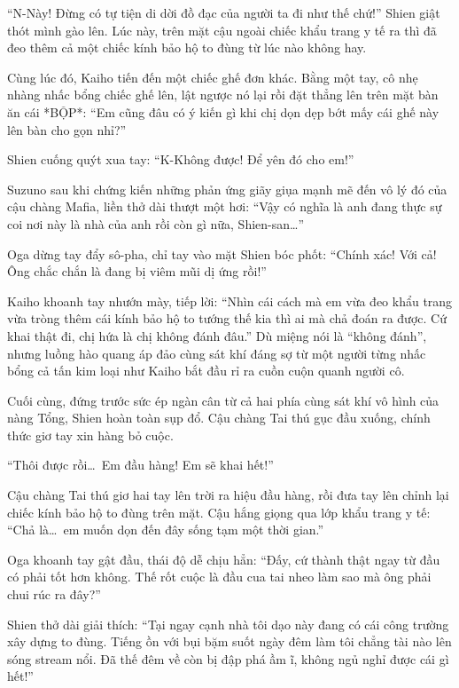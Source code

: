 \documentclass[../main.tex]{subfiles}
\begin{document}
``N-Này! Đừng có tự tiện di dời đồ đạc của người ta đi như thế chứ!'' Shien giật thót mình gào lên. Lúc này, trên mặt cậu ngoài chiếc khẩu trang y tế ra thì đã đeo thêm cả một chiếc kính bảo hộ to đùng từ lúc nào không hay.


Cùng lúc đó, Kaiho tiến đến một chiếc ghế đơn khác. Bằng một tay, cô nhẹ nhàng nhấc bổng chiếc ghế lên, lật ngược nó lại rồi đặt thẳng lên trên mặt bàn ăn cái *BỘP*: ``Em cũng đâu có ý kiến gì khi chị dọn dẹp bớt mấy cái ghế này lên bàn cho gọn nhỉ?''

Shien cuống quýt xua tay: ``K-Không được! Để yên đó cho em!''

Suzuno sau khi chứng kiến những phản ứng giãy giụa mạnh mẽ đến vô lý đó của cậu chàng Mafia, liền thở dài thượt một hơi: ``Vậy có nghĩa là anh đang thực sự coi nơi này là nhà của anh rồi còn gì nữa, Shien-san\dots''

Oga dừng tay đẩy sô-pha, chỉ tay vào mặt Shien bóc phốt: ``Chính xác! Với cả! Ông chắc chắn là đang bị viêm mũi dị ứng rồi!''

Kaiho khoanh tay nhướn mày, tiếp lời: ``Nhìn cái cách mà em vừa đeo khẩu trang vừa tròng thêm cái kính bảo hộ to tướng thế kia thì ai mà chả đoán ra được. Cứ khai thật đi, chị hứa là chị không đánh đâu.'' Dù miệng nói là ``không đánh'', nhưng luồng hào quang áp đảo cùng sát khí đáng sợ từ một người từng nhấc bổng cả tấn kim loại như Kaiho bắt đầu rỉ ra cuồn cuộn quanh người cô.

Cuối cùng, đứng trước sức ép ngàn cân từ cả hai phía cùng sát khí vô hình của nàng Tổng, Shien hoàn toàn sụp đổ. Cậu chàng Tai thú gục đầu xuống, chính thức giơ tay xin hàng bỏ cuộc.

``Thôi được rồi\dots\ Em đầu hàng! Em sẽ khai hết!''

Cậu chàng Tai thú giơ hai tay lên trời ra hiệu đầu hàng, rồi đưa tay lên chỉnh lại chiếc kính bảo hộ to đùng trên mặt. Cậu hắng giọng qua lớp khẩu trang y tế: ``Chả là\dots\ em muốn dọn đến đây sống tạm một thời gian.''

Oga khoanh tay gật đầu, thái độ dễ chịu hẳn: ``Đấy, cứ thành thật ngay từ đầu có phải tốt hơn không. Thế rốt cuộc là đầu cua tai nheo làm sao mà ông phải chui rúc ra đây?''

Shien thở dài giải thích: ``Tại ngay cạnh nhà tôi dạo này đang có cái công trường xây dựng to đùng. Tiếng ồn với bụi bặm suốt ngày đêm làm tôi chẳng tài nào lên sóng stream nổi. Đã thế đêm về còn bị đập phá ầm ĩ, không ngủ nghỉ được cái gì hết!''
\end{document}
